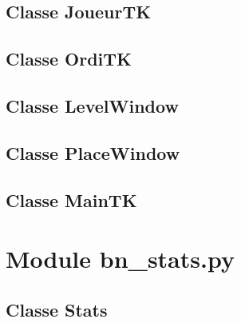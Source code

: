 \subsection{Classe JoueurTK}


\subsection{Classe OrdiTK}


\subsection{Classe LevelWindow}


\subsection{Classe PlaceWindow}


\subsection{Classe MainTK}



\section{Module bn\_stats.py}
\subsection{Classe Stats}


